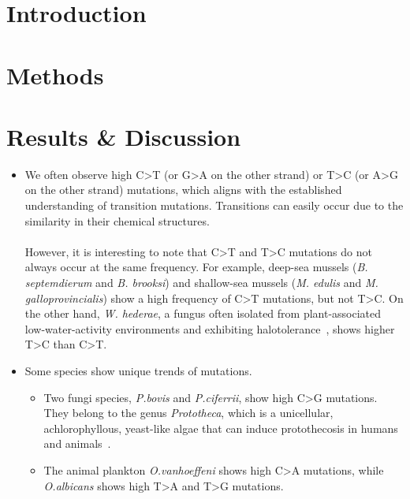 \documentclass{article}
\begin{document}
\section{Introduction}


\section{Methods}

\section{Results \& Discussion}
\begin{itemize}
  \item We often observe high C>T (or G>A on the other strand) or T>C (or A>G on the other strand) mutations, which aligns with the established understanding of transition mutations. Transitions can easily occur due to the similarity in their chemical structures. \\
    \\
    However, it is interesting to note that C>T and T>C mutations do not always occur at the same frequency. For example, deep-sea mussels (\textit{B. septemdierum} and \textit{B. brooksi}) and shallow-sea mussels (\textit{M. edulis} and \textit{M. galloprovincialis}) show a high frequency of C>T mutations, but not T>C. On the other hand, \textit{W. hederae}, a fungus often isolated from plant-associated low-water-activity environments and exhibiting halotolerance~\cite{janvcivc2016halophily}, shows higher T>C than C>T.
  \item Some species show unique trends of mutations.
    \begin{itemize}
      \item Two fungi species, \textit{P.bovis} and \textit{P.ciferrii}, show high C>G mutations. They belong to the genus \textit{Prototheca}, which is a unicellular, achlorophyllous, yeast-like algae that can induce protothecosis in humans and animals~\cite{hifney2022microbial}.
      \item The animal plankton \textit{O.vanhoeffeni} shows high C>A mutations, while \textit{O.albicans} shows high T>A and T>G mutations.
    \end{itemize}
\end{itemize}
\end{document}
